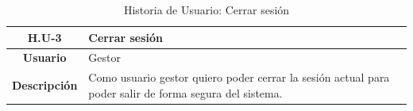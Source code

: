 \begin{table}[!h]
	\begin{center}
		\begin{tabular}{|c|p{10cm}|}
			\hline \textbf{H.U-3} & Cerrar sesión \\ 
			\hline \textbf{Usuario} & Gestor \\ 
			\hline \textbf{Descripción} & Como usuario gestor quiero poder cerrar la sesión actual para poder salir de forma segura del sistema. \\ 
			\hline 
		\end{tabular}
		\caption{Historia de Usuario: Cerrar sesión}
		\label{tab:HU3}
	\end{center}
\end{table}




